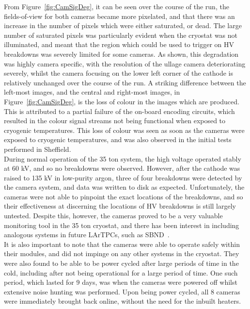 From Figure~\ref{fig:CamSigDeg}, it can be seen over the course of the run, the fields-of-view for both cameras became more pixelated, and that there was an increase in the number of pixels which were either saturated, or dead. The large number of saturated pixels was particularly evident when the cryostat was not illuminated, and meant that the region which could be used to trigger on HV breakdowns was severely limited for some cameras. As shown, this degradation was highly camera specific, with the resolution of the ullage camera deteriorating severely, whilst the camera focusing on the lower left corner of the cathode is relatively unchanged over the course of the run. A striking difference between the left-most images, and the central and right-most images, in Figure~\ref{fig:CamSigDeg}, is the loss of colour in the images which are produced. This is attributed to a partial failure of the on-board encoding circuits, which resulted in the colour signal streams not being functional when exposed to cryogenic temperatures. This loss of colour was seen as soon as the cameras were exposed to cryogenic temperatures, and was also observed in the initial tests performed in Sheffield. \\

During normal operation of the 35 ton system, the high voltage operated stably at 60 kV, and so no breakdowns were observed. However, after the cathode was raised to 135 kV in low-purity argon, three of four breakdowns were detected by the camera system, and data was written to disk as expected. Unfortunately, the cameras were not able to pinpoint the exact locations of the breakdowns, and so their effectiveness at discerning the locations of HV breakdowns is still largely untested. Despite this, however, the cameras proved to be a very valuable monitoring tool in the 35 ton cryostat, and there has been interest in including analogous systems in future LArTPCs, such as SBND~\citep{SBNProposal}. \\

It is also important to note that the cameras were able to operate safely within their modules, and did not impinge on any other systems in the cryostat. They were also found to be able to be power cycled after large periods of time in the cold, including after not being operational for a large period of time. One such period, which lasted for 9 days, was when the cameras were powered off whilst extensive noise hunting was performed. Upon being power cycled, all 8 cameras were immediately brought back online, without the need for the inbuilt heaters. \\
